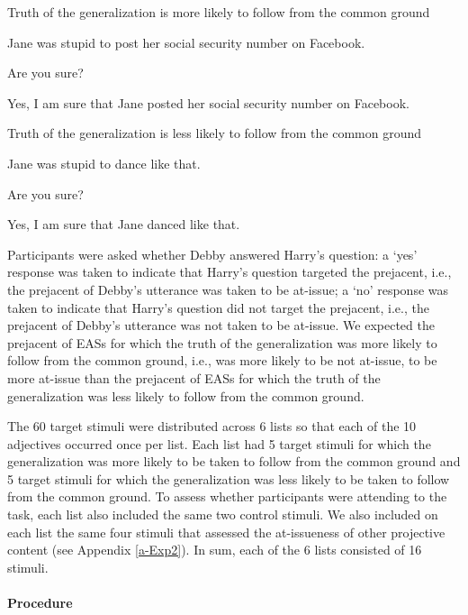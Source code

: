 \documentclass[11pt,fleqn]{article}
\newcommand{\6}{\mbox{$[\hspace*{-.6mm}[$}}
\newcommand{\9}{\mbox{$]\hspace*{-.6mm}]$}}
\begin{document}
\begin{exe}
\ex\label{sure2} Truth of the generalization is more likely to follow from the common ground
\begin{xlist}
 Jane was stupid to post her social security number on Facebook. 

 Are you sure?

 Yes, I am sure that Jane posted her social security number on Facebook.
\end{xlist}

\ex\label{sure22} Truth of the generalization is less likely to follow from the common ground
\begin{xlist}
 Jane was stupid to dance like that. 

 Are you sure?

 Yes, I am sure that Jane danced like that.
\end{xlist}
\end{exe}

Participants were asked whether Debby answered Harry's question: a `yes' response was taken to indicate that Harry's question targeted the prejacent, i.e., the prejacent of Debby's utterance was taken to be at-issue; a `no' response was taken to indicate that Harry's question did not target the prejacent, i.e., the prejacent of Debby's utterance was not taken to be at-issue. We expected the prejacent of EASs for which the truth of the generalization was more likely to follow from the common ground, i.e., was more likely to be not at-issue, to be more at-issue than the prejacent of EASs for which the truth of the generalization was less likely to follow from the common ground.

The 60 target stimuli were distributed across 6 lists so that each of the 10 adjectives occurred once per list. Each list had 5 target stimuli for which the generalization was more likely to be taken to follow from the common ground and 5 target stimuli for which the generalization was less likely to be taken to follow from the common ground. To assess whether participants were attending to the task, each list also included the same two control stimuli. We also included on each list the same four stimuli that assessed the at-issueness of other projective content (see Appendix \ref{a-Exp2}). In sum, each of the 6 lists consisted of 16 stimuli.

\paragraph{Procedure} 
\end{document}
